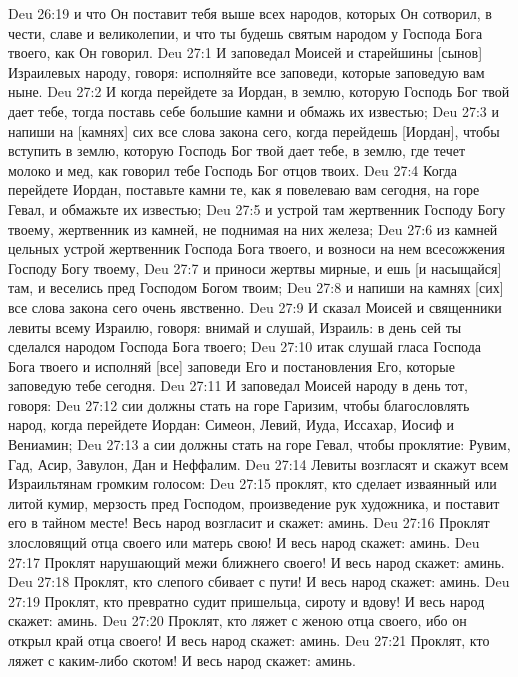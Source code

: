 \vs Deu 26:19 и что Он поставит тебя выше всех народов, которых Он сотворил, в чести, славе и великолепии, и что ты будешь святым народом у Господа Бога твоего, как Он говорил.
\vs Deu 27:1 И заповедал Моисей и старейшины [сынов] Израилевых народу, говоря: исполняйте все заповеди, которые заповедую вам ныне.
\vs Deu 27:2 И когда перейдете за Иордан, в землю, которую Господь Бог твой дает тебе, тогда поставь себе большие камни и обмажь их известью;
\vs Deu 27:3 и напиши на [камнях] сих все слова закона сего, когда перейдешь [Иордан], чтобы вступить в землю, которую Господь Бог твой дает тебе, в землю, где течет молоко и мед, как говорил тебе Господь Бог отцов твоих.
\vs Deu 27:4 Когда перейдете Иордан, поставьте камни те, как я повелеваю вам сегодня, на горе Гевал, и обмажьте их известью;
\vs Deu 27:5 и устрой там жертвенник Господу Богу твоему, жертвенник из камней, не поднимая на них железа;
\vs Deu 27:6 из камней цельных устрой жертвенник Господа Бога твоего, и возноси на нем всесожжения Господу Богу твоему,
\vs Deu 27:7 и приноси жертвы мирные, и ешь [и насыщайся] там, и веселись пред Господом Богом твоим;
\vs Deu 27:8 и напиши на камнях [сих] все слова закона сего очень явственно.
\rsbpar\vs Deu 27:9 И сказал Моисей и священники левиты всему Израилю, говоря: внимай и слушай, Израиль: в день сей ты сделался народом Господа Бога твоего;
\vs Deu 27:10 итак слушай гласа Господа Бога твоего и исполняй [все] заповеди Его и постановления Его, которые заповедую тебе сегодня.
\vs Deu 27:11 И заповедал Моисей народу в день тот, говоря:
\vs Deu 27:12 сии должны стать на горе Гаризим, чтобы благословлять народ, когда перейдете Иордан: Симеон, Левий, Иуда, Иссахар, Иосиф и Вениамин;
\vs Deu 27:13 а сии должны стать на горе Гевал, чтобы  проклятие: Рувим, Гад, Асир, Завулон, Дан и Неффалим.
\vs Deu 27:14 Левиты возгласят и скажут всем Израильтянам громким голосом:
\vs Deu 27:15 проклят, кто сделает изваянный или литой кумир, мерзость пред Господом, произведение рук художника, и поставит его в тайном месте! Весь народ возгласит и скажет: аминь.
\vs Deu 27:16 Проклят злословящий отца своего или матерь свою! И весь народ скажет: аминь.
\vs Deu 27:17 Проклят нарушающий межи ближнего своего! И весь народ скажет: аминь.
\vs Deu 27:18 Проклят, кто слепого сбивает с пути! И весь народ скажет: аминь.
\vs Deu 27:19 Проклят, кто превратно судит пришельца, сироту и вдову! И весь народ скажет: аминь.
\vs Deu 27:20 Проклят, кто ляжет с женою отца своего, ибо он открыл край  отца своего! И весь народ скажет: аминь.
\vs Deu 27:21 Проклят, кто ляжет с каким-либо скотом! И весь народ скажет: аминь.
